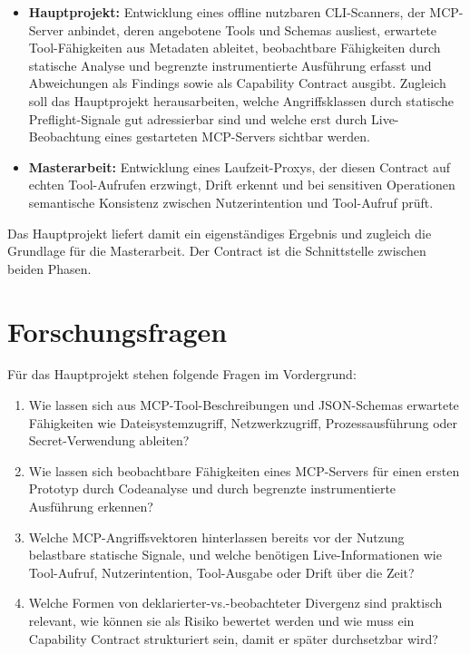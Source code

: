 \documentclass[pdflatex,sn-mathphys-num]{sn-jnl}%
\theoremstyle{thmstyleone}%
\theoremstyle{thmstyletwo}%
\theoremstyle{thmstylethree}%
\begin{document}
\begin{itemize}
\item \textbf{Hauptprojekt:} Entwicklung eines offline nutzbaren CLI-Scanners, der MCP-Server anbindet, deren angebotene Tools und Schemas ausliest, erwartete Tool-F\"ahigkeiten aus Metadaten ableitet, beobachtbare F\"ahigkeiten durch statische Analyse und begrenzte instrumentierte Ausf\"uhrung erfasst und Abweichungen als Findings sowie als Capability Contract ausgibt. Zugleich soll das Hauptprojekt herausarbeiten, welche Angriffsklassen durch statische Preflight-Signale gut adressierbar sind und welche erst durch Live-Beobachtung eines gestarteten MCP-Servers sichtbar werden.
\item \textbf{Masterarbeit:} Entwicklung eines Laufzeit-Proxys, der diesen Contract auf echten Tool-Aufrufen erzwingt, Drift erkennt und bei sensitiven Operationen semantische Konsistenz zwischen Nutzerintention und Tool-Aufruf pr\"uft.
\end{itemize}

Das Hauptprojekt liefert damit ein eigenst\"andiges Ergebnis und zugleich die Grundlage f\"ur die Masterarbeit. Der Contract ist die Schnittstelle zwischen beiden Phasen.

\section{Forschungsfragen}\label{sec:questions}

F\"ur das Hauptprojekt stehen folgende Fragen im Vordergrund:

\begin{enumerate}
\item Wie lassen sich aus MCP-Tool-Beschreibungen und JSON-Schemas erwartete F\"ahigkeiten wie Dateisystemzugriff, Netzwerkzugriff, Prozessausf\"uhrung oder Secret-Verwendung ableiten?
\item Wie lassen sich beobachtbare F\"ahigkeiten eines MCP-Servers f\"ur einen ersten Prototyp durch Codeanalyse und durch begrenzte instrumentierte Ausf\"uhrung erkennen?
\item Welche MCP-Angriffsvektoren hinterlassen bereits vor der Nutzung belastbare statische Signale, und welche ben\"otigen Live-Informationen wie Tool-Aufruf, Nutzerintention, Tool-Ausgabe oder Drift \"uber die Zeit?
\item Welche Formen von deklarierter-vs.-beobachteter Divergenz sind praktisch relevant, wie k\"onnen sie als Risiko bewertet werden und wie muss ein Capability Contract strukturiert sein, damit er sp\"ater durchsetzbar wird?
\end{enumerate}
\end{document}
